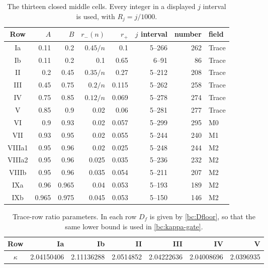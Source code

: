 \begin{table}[ht]
\centering\small
\caption{The thirteen closed middle cells.  Every integer in a displayed
$j$ interval is used, with $R_j=j/1000$.}
\label{bc:compact-cover}
\begin{tabular}{@{}crrrrrrl@{}}\toprule
Row&$A$&$B$&$r_-(n)$&$r_+$&$j$ interval&number&field\\\midrule
Ia & 0.11 & 0.2 & $0.45/n$ & 0.1 & 5--266 & 262 & Trace\\
Ib & 0.11 & 0.2 & 0.1 & 0.65 & 6--91 & 86 & Trace\\
II & 0.2 & 0.45 & $0.35/n$ & 0.27 & 5--212 & 208 & Trace\\
III & 0.45 & 0.75 & $0.2/n$ & 0.115 & 5--262 & 258 & Trace\\
IV & 0.75 & 0.85 & $0.12/n$ & 0.069 & 5--278 & 274 & Trace\\
V & 0.85 & 0.9 & 0.02 & 0.06 & 5--281 & 277 & Trace\\
VI & 0.9 & 0.93 & 0.02 & 0.057 & 5--299 & 295 & M0\\
VII & 0.93 & 0.95 & 0.02 & 0.055 & 5--244 & 240 & M1\\
VIIIa1 & 0.95 & 0.96 & 0.02 & 0.025 & 5--248 & 244 & M2\\
VIIIa2 & 0.95 & 0.96 & 0.025 & 0.035 & 5--236 & 232 & M2\\
VIIIb & 0.95 & 0.96 & 0.035 & 0.054 & 5--211 & 207 & M2\\
IXa & 0.96 & 0.965 & 0.04 & 0.053 & 5--193 & 189 & M2\\
IXb & 0.965 & 0.975 & 0.045 & 0.053 & 5--150 & 146 & M2\\
\bottomrule\end{tabular}
\end{table}
\begin{table}[ht]
\centering\small
\caption{Trace-row ratio parameters.  In each row $D_f$ is given by
\eqref{bc:Dfloor}, so that the same lower bound is used in
\eqref{bc:kappa-gate}.}
\label{bc:trace-ratios}
\begin{tabular}{@{}crrrrrr@{}}\toprule
Row&Ia&Ib&II&III&IV&V\\\midrule
$\kappa$&2.04150406 & 2.11136288 & 2.0514852 & 2.04222636 & 2.04008696 & 2.0396935\\
\bottomrule\end{tabular}
\end{table}
